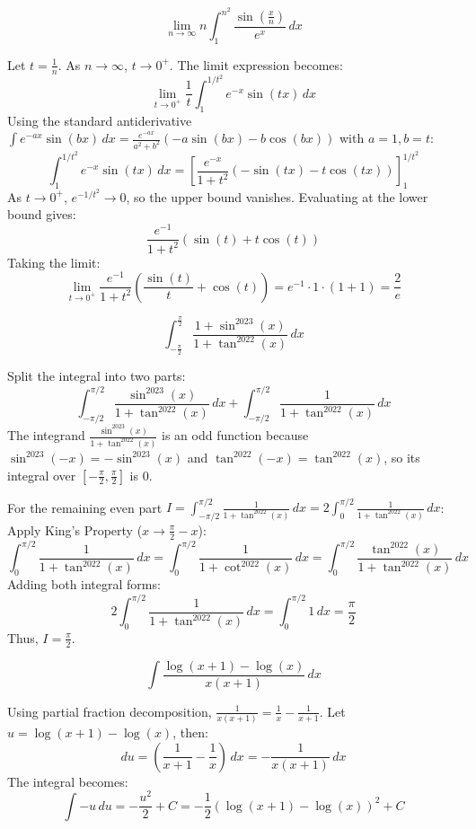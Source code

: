 \begin{questions}
\question
\[ \lim_{n \to \infty} n \int_1^{n^2} \frac{\sin\left(\frac{x}{n}\right)}{e^x} \, dx \]
\begin{solution}
Let $t = \frac{1}{n}$. As $n \to \infty$, $t \to 0^+$. The limit expression becomes:
\[ \lim_{t \to 0^+} \frac{1}{t} \int_1^{1/t^2} e^{-x} \sin(tx) \, dx \]
Using the standard antiderivative $\int e^{-ax}\sin(bx) \, dx = \frac{e^{-ax}}{a^2+b^2}(-a\sin(bx) - b\cos(bx))$ with $a=1, b=t$:
\[ \int_1^{1/t^2} e^{-x} \sin(tx) \, dx = \left[ \frac{e^{-x}}{1+t^2}(-\sin(tx) - t\cos(tx)) \right]_1^{1/t^2} \]
As $t \to 0^+$, $e^{-1/t^2} \to 0$, so the upper bound vanishes. Evaluating at the lower bound gives:
\[ \frac{e^{-1}}{1+t^2}(\sin(t) + t\cos(t)) \]
Taking the limit:
\[ \lim_{t \to 0^+} \frac{e^{-1}}{1+t^2} \left( \frac{\sin(t)}{t} + \cos(t) \right) = e^{-1} \cdot 1 \cdot (1 + 1) = \frac{2}{e} \]
\end{solution}

\question
\[ \int_{-\frac{\pi}{2}}^{\frac{\pi}{2}} \frac{1 + \sin^{2023}(x)}{1 + \tan^{2022}(x)} \, dx \]
\begin{solution}
Split the integral into two parts:
\[ \int_{-\pi/2}^{\pi/2} \frac{\sin^{2023}(x)}{1 + \tan^{2022}(x)} \, dx + \int_{-\pi/2}^{\pi/2} \frac{1}{1 + \tan^{2022}(x)} \, dx \]
The integrand $\frac{\sin^{2023}(x)}{1 + \tan^{2022}(x)}$ is an odd function because $\sin^{2023}(-x) = -\sin^{2023}(x)$ and $\tan^{2022}(-x) = \tan^{2022}(x)$, so its integral over $[-\frac{\pi}{2}, \frac{\pi}{2}]$ is $0$.

For the remaining even part $I = \int_{-\pi/2}^{\pi/2} \frac{1}{1 + \tan^{2022}(x)} \, dx = 2 \int_0^{\pi/2} \frac{1}{1 + \tan^{2022}(x)} \, dx$:
Apply King's Property ($x \to \frac{\pi}{2} - x$):
\[ \int_0^{\pi/2} \frac{1}{1 + \tan^{2022}(x)} \, dx = \int_0^{\pi/2} \frac{1}{1 + \cot^{2022}(x)} \, dx = \int_0^{\pi/2} \frac{\tan^{2022}(x)}{1 + \tan^{2022}(x)} \, dx \]
Adding both integral forms:
\[ 2 \int_0^{\pi/2} \frac{1}{1 + \tan^{2022}(x)} \, dx = \int_0^{\pi/2} 1 \, dx = \frac{\pi}{2} \]
Thus, $I = \frac{\pi}{2}$.
\end{solution}

\question
\[ \int \frac{\log(x+1) - \log(x)}{x(x+1)} \, dx \]
\begin{solution}
Using partial fraction decomposition, $\frac{1}{x(x+1)} = \frac{1}{x} - \frac{1}{x+1}$.
Let $u = \log(x+1) - \log(x)$, then:
\[ du = \left( \frac{1}{x+1} - \frac{1}{x} \right) \, dx = -\frac{1}{x(x+1)} \, dx \]
The integral becomes:
\[ \int -u \, du = -\frac{u^2}{2} + C = -\frac{1}{2} (\log(x+1) - \log(x))^2 + C \]
\end{solution}


\end{questions}
